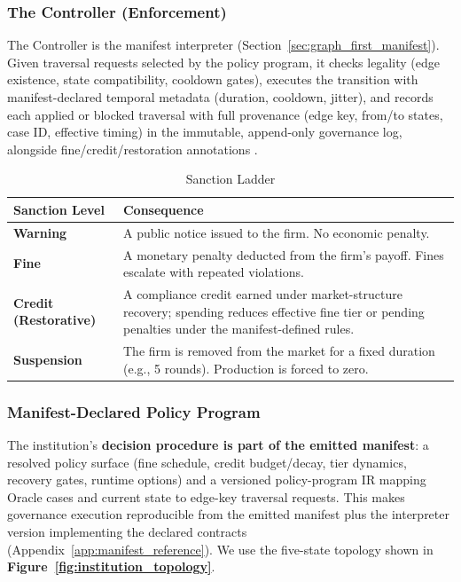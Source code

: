 \documentclass[11pt, a4paper]{article}
\begin{document}
\subsubsection{The Controller (Enforcement)}
The Controller is the manifest interpreter (Section~\ref{sec:graph_first_manifest}). Given traversal requests selected by the policy program, it checks legality (edge existence, state compatibility, cooldown gates), executes the transition with manifest-declared temporal metadata (duration, cooldown, jitter), and records each applied or blocked traversal with full provenance (edge key, from/to states, case ID, effective timing) in the immutable, append-only governance log, alongside fine/credit/restoration annotations \citep{Boella2007NormativeMAS,Botti2016ROMAS}.

\begin{table}[h]
\centering
\begin{tabular}{@{}lp{10cm}@{}}
\toprule
\textbf{Sanction Level} & \textbf{Consequence} \\ \midrule
\textbf{Warning} & A public notice issued to the firm. No economic penalty. \\
\textbf{Fine} & A monetary penalty deducted from the firm's payoff. Fines escalate with repeated violations. \\
\textbf{Credit (Restorative)} & A compliance credit earned under market-structure recovery; spending reduces effective fine tier or pending penalties under the manifest-defined rules. \\
\textbf{Suspension} & The firm is removed from the market for a fixed duration (e.g., 5 rounds). Production is forced to zero. \\ \bottomrule
\end{tabular}
\caption{Sanction Ladder}
\label{tab:sanctions}
\end{table}

\subsubsection{Manifest-Declared Policy Program}
The institution's \textbf{decision procedure is part of the emitted manifest}: a resolved policy surface (fine schedule, credit budget/decay, tier dynamics, recovery gates, runtime options) and a versioned policy-program IR mapping Oracle cases and current state to edge-key traversal requests. This makes governance execution reproducible from the emitted manifest plus the interpreter version implementing the declared contracts (Appendix~\ref{app:manifest_reference}). We use the five-state topology shown in \textbf{Figure~\ref{fig:institution_topology}}.
\end{document}
